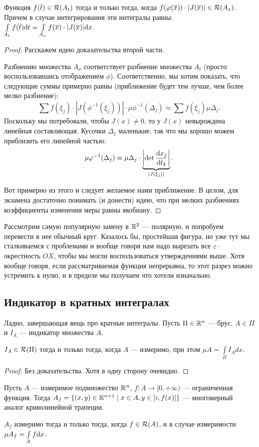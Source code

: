 \begin{Statement}
Функция $f(\overline t) \in \mathcal{R}(A_t)$ тогда и только тогда, когда $f(\varphi(\overline x)) \cdot|J(\overline x)| \in \mathcal{R}(A_x)$. Причем в случае интегрирования эти интегралы равны: $\int\limits_{A_t} f(\overline t) \mathrm{d} t = \int\limits_{A_x} f(\overline x) \cdot |J(\overline{x})| \mathrm{d} x$.
\end{Statement}
\begin{proof}
Расскажем идею доказательства второй части.

Разбиению множества $A_x$ соответствует разбиение множества $A_t$ (просто воспользовавшись отображением $\phi$). Соответственно, мы хотим показать, что следующие суммы примерно равны (приближение будет тем лучше, чем более мелко разбиение):
$$
\sum f(\xi_j) \cdot |J(\phi^{-1}(\xi_j))| \cdot \mu \phi^{-1}(\Delta_j) \approx \sum f(\xi_j) \mu \Delta_j.
$$
Поскольку мы потребовали, чтобы $J(x) \neq 0$, то у $J(x)$ невырождена линейная составляющая. Кусочки $\Delta_j$ маленькие, так что мы хорошо можем приблизить его линейной частью:
$$
\mu \varphi^{-1}(\Delta_j) \equiv \mu \Delta_j \cdot \underbrace{\left| \det \dfrac{\mathrm{d} x_j}{\mathrm{d} t_k} \right|}_{|J(\xi_j)|}.
$$

Вот примерно из этого и следует желаемое нами приближение. В целом, для экзамена достаточно понимать (и донести) идею, что при мелких разбиениях коэффициенты изменения меры равны якобиану.
\end{proof}

Рассмотрим самую популярную замену в $\mathbb{R}^2$ --- полярную, и попробуем перевести в нее обычный круг. Казалось бы, простейшая фигура, но уже тут мы сталкиваемся с проблемами и вообще говоря нам надо вырезать все $\varepsilon$--окрестность $OX$, чтобы мы могли воспользоваться утверждениями выше. Хотя вообще говоря, если рассматриваемая функция непрерывна, то этот разрез можно устремить к нулю, и в пределе мы получаем что хотели изначально.

\subsection{Индикатор в кратных интегралах}

Ладно, завершающая вещь про кратные интегралы. Пусть $\Pi \in \mathbb{R}^n$ --- брус, $A \in \Pi$ и $I_A$ --- индикатор множества $A$.

\begin{Statement}
$I_A \in \mathcal{R}(\Pi)$ тогда и только тогда, когда $A$ --- измеримо, при этом $\mu A = \int\limits_\Pi I_A dx$.
\end{Statement}
\begin{proof}
Без доказательства. Хотя в одну сторону очевидно.
\end{proof}
Пусть $A$ --- измеримое подмножество $\mathbb{R}^n$, $f: A \to [0, +\infty)$ --- ограниченная функция. Тогда $A_f = \{ (x, y) \in \mathbb{R}^{n+1} \mid x\in  A, y \in [i, f(x)] \}$ --- многомерный аналог криволинейной трапеции.
\begin{Statement}
$A_f$ измеримо тогда и только тогда, когда $f\in \mathcal{R}(A)$, и в случае измеримости $\mu A_f = \int\limits_A f\mathrm{d}x$. 
\end{Statement}

